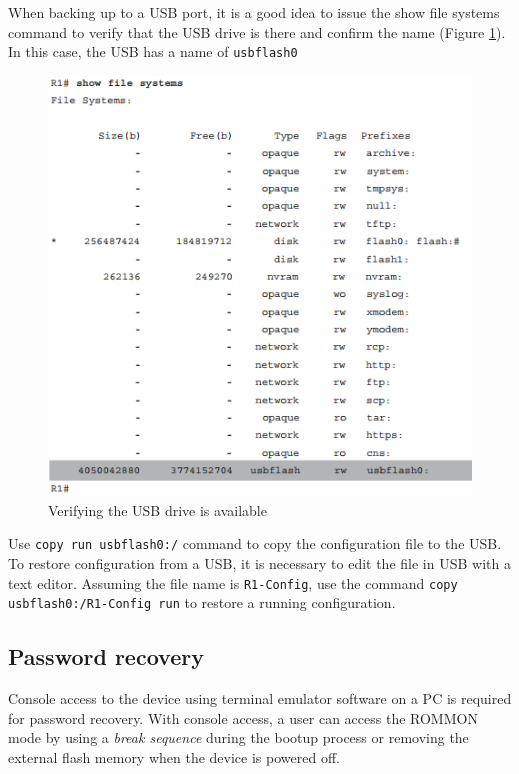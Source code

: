When backing up to a USB port, it is a good idea to issue the show file systems command to verify that the USB drive is there and confirm the name (Figure \ref{USB}). In this case, the USB has a name of \verb|usbflash0|

\begin{figure}[hbtp]
\caption{Verifying the USB drive is available}\label{USB}
\centering
\includegraphics[scale=0.8]{pictures/USB.PNG}
\end{figure}

Use \verb|copy run usbflash0:/| command to copy the configuration file to the USB. To restore configuration from a USB, it is necessary to edit the file in USB with a text editor. Assuming the file name is \verb|R1-Config|, use the command \verb|copy usbflash0:/R1-Config run| to restore a running configuration.

\subsection{Password recovery}

Console access to the device using terminal emulator software on a PC is required for password recovery. With console access, a user can access the ROMMON mode by using a \emph{break sequence} during the bootup process or removing the external flash memory when the device is powered off.\\

